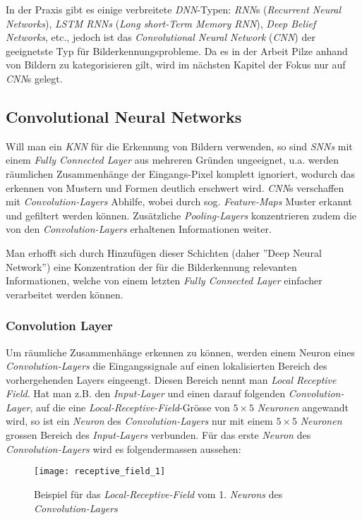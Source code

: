 In der Praxis gibt es einige verbreitete \textit{DNN}-Typen: \textit{RNN}s (\textit{Recurrent Neural Networks}), \textit{LSTM RNNs} (\textit{Long short-Term Memory RNN}), \textit{Deep Belief Networks}, etc., jedoch ist das \textit{Convolutional Neural Network} (\textit{CNN}) der geeignetste Typ für Bilderkennungsprobleme. Da es in der Arbeit Pilze anhand von Bildern zu kategorisieren gilt, wird im nächsten Kapitel der Fokus nur auf \textit{CNN}s gelegt.

\subsection{Convolutional Neural Networks}\label{cha:theo:cnn}
Will man ein \textit{KNN} für die Erkennung von Bildern verwenden, so sind \textit{SNNs} mit einem \textit{Fully Connected Layer} aus mehreren Gründen ungeeignet, u.a. werden räumlichen Zusammenhänge der Eingangs-Pixel komplett ignoriert, wodurch das erkennen von Mustern und Formen deutlich erschwert wird. \textit{CNN}s verschaffen mit \textit{Convolution-Layers} Abhilfe, wobei durch sog. \textit{Feature-Maps} Muster erkannt und gefiltert werden können. Zusätzliche \textit{Pooling-Layers} konzentrieren zudem die von den \textit{Convolution-Layers} erhaltenen Informationen weiter.

Man erhofft sich durch Hinzufügen dieser Schichten (daher ''Deep Neural Network'') eine Konzentration der für die Bilderkennung relevanten Informationen, welche von einem letzten \textit{Fully Connected Layer} einfacher verarbeitet werden können.

\subsubsection{Convolution Layer}
Um räumliche Zusammenhänge erkennen zu können, werden einem Neuron eines \textit{Convolution-Layers} die Eingangssignale auf einen lokalisierten Bereich des vorhergehenden Layers eingeengt. Diesen Bereich nennt man \textit{Local Receptive Field}. Hat man z.B. den \textit{Input-Layer} und einen darauf folgenden \textit{Convolution-Layer}, auf die eine \textit{Local-Receptive-Field}-Grösse von $5\times 5$ \textit{Neuronen} angewandt wird, so ist ein \textit{Neuron} des \textit{Convolution-Layers} nur mit einem $5\times 5$ \textit{Neuronen} grossen Bereich des \textit{Input-Layers} verbunden. Für das erste \textit{Neuron} des \textit{Convolution-Layers} wird es folgendermassen aussehen:

\begin{figure}[h]
	\ContinuedFloat*
	\centering
	\texttt{[image: receptive\_field\_1]}
	\caption[Beispiel für das \textit{Local-Receptive-Field} 1. \textit{Neuron}]{Beispiel für das \textit{Local-Receptive-Field} vom 1. \textit{Neurons} des \textit{Convolution-Layers}}
	\label{img:rec_field1}
\end{figure}

